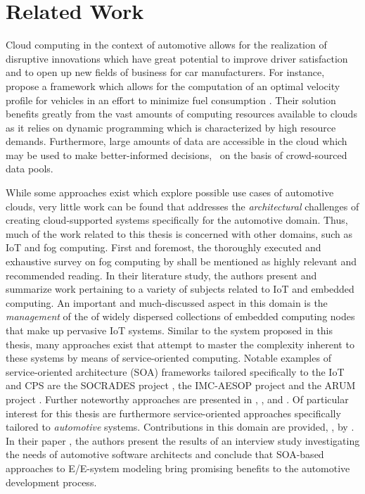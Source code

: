 \chapter{Related Work}\label{chapter:related-work}
Cloud computing in the context of automotive allows for the realization of disruptive innovations which have great potential to improve driver satisfaction and to open up new fields of business for car manufacturers. For instance, \citeauthor*{wollaeger2012cloud} propose a framework which allows for the computation of an optimal velocity profile for vehicles in an effort to minimize fuel consumption \cite{wollaeger2012cloud}. Their solution benefits greatly from the vast amounts of computing resources available to clouds as it relies on dynamic programming which is characterized by high resource demands. Furthermore, large amounts of data are accessible in the cloud which may be used to make better-informed decisions, \eg\ on the basis of crowd-sourced data pools.

While some approaches exist which explore possible use cases of automotive clouds, very little work can be found that addresses the \emph{architectural} challenges of creating cloud-supported systems specifically for the automotive domain.
Thus, much of the work related to this thesis is concerned with other domains, such as IoT and fog computing. First and foremost, the thoroughly executed and exhaustive survey \cite{nath2018survey} on fog computing by \citeauthor*{nath2018survey} shall be mentioned as highly relevant and recommended reading. In their literature study, the authors present and summarize work pertaining to a variety of subjects related to IoT and embedded computing.
An important and much-discussed aspect in this domain is the \emph{management} of the of widely dispersed collections of embedded computing nodes that make up pervasive IoT systems. Similar to the system proposed in this thesis, many approaches exist that attempt to master the complexity inherent to these systems by means of service-oriented computing. Notable examples of service-oriented architecture (SOA) frameworks tailored specifically to the IoT and CPS are the SOCRADES project \cite{cannata2008socrades}, the IMC-AESOP project \cite{karnouskos2012soa} and the ARUM project \cite{marin2013conceptual}. Further noteworthy approaches are presented in \cite{butzin2016microservices}, \cite{kart2007distributed}, and \cite{teixeira2011service}. Of particular interest for this thesis are furthermore service-oriented approaches specifically tailored to \emph{automotive} systems. Contributions in this domain are provided, \eg , by \citeauthor*{kugele2017service}. In their paper \cite{kugele2017service}, the authors present the results of an interview study investigating the needs of automotive software architects and conclude that SOA-based approaches to E/E-system modeling bring promising benefits to the automotive development process.

